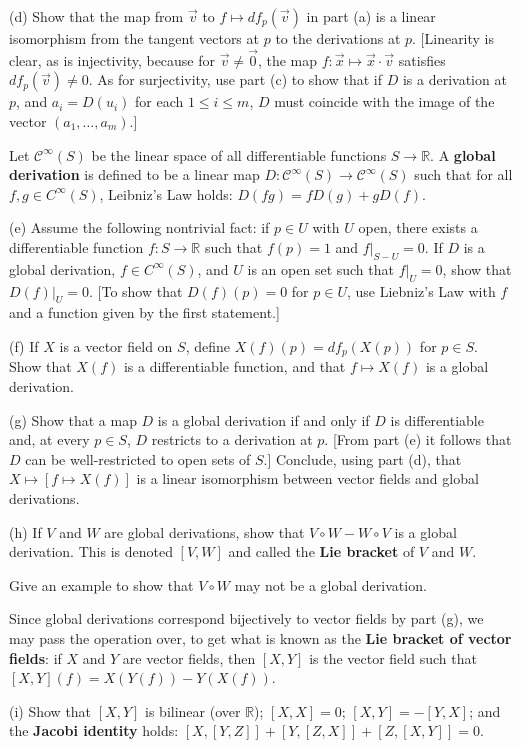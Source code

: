 \documentclass[leqno]{book}
\begin{document}
\begin{enumerate}
(d) Show that the map from $\vec v$ to $f\mapsto df_p(\vec v)$ in part (a) is a linear isomorphism from the tangent vectors at $p$ to the derivations at $p$.  [Linearity is clear, as is injectivity, because for $\vec v\ne\vec 0$, the map $f:\vec x\mapsto\vec x\cdot\vec v$ satisfies $df_p(\vec v)\ne 0$.  As for surjectivity, use part (c) to show that if $D$ is a derivation at $p$, and $a_i=D(u_i)$ for each $1\leqslant i\leqslant m$, $D$ must coincide with the image of the vector $(a_1,\dots,a_m)$.]

Let $\mathcal C^\infty(S)$ be the linear space of all differentiable functions $S\to\mathbb R$.  A \textbf{global derivation} is defined to be a linear map $D:\mathcal C^\infty(S)\to\mathcal C^\infty(S)$ such that for all $f,g\in C^\infty(S)$, Leibniz's Law holds: $D(fg)=fD(g)+gD(f)$.

(e) Assume the following nontrivial fact: if $p\in U$ with $U$ open, there exists a differentiable function $f:S\to\mathbb R$ such that $f(p)=1$ and $f|_{S-U}=0$.  If $D$ is a global derivation, $f\in C^\infty(S)$, and $U$ is an open set such that $f|_U=0$, show that $D(f)|_U=0$.  [To show that $D(f)(p)=0$ for $p\in U$, use Liebniz's Law with $f$ and a function given by the first statement.]

(f) If $X$ is a vector field on $S$, define $X(f)(p)=df_p(X(p))$ for $p\in S$.  Show that $X(f)$ is a differentiable function, and that $f\mapsto X(f)$ is a global derivation.

(g) Show that a map $D$ is a global derivation if and only if $D$ is differentiable and, at every $p\in S$, $D$ restricts to a derivation at $p$.  [From part (e) it follows that $D$ can be well-restricted to open sets of $S$.]  Conclude, using part (d), that $X\mapsto[f\mapsto X(f)]$ is a linear isomorphism between vector fields and global derivations.

(h) If $V$ and $W$ are global derivations, show that $V\circ W-W\circ V$ is a global derivation.  This is denoted $[V,W]$ and called the \textbf{Lie bracket} of $V$ and $W$.

Give an example to show that $V\circ W$ may not be a global derivation.

Since global derivations correspond bijectively to vector fields by part (g), we may pass the operation over, to get what is known as the \textbf{Lie bracket of vector fields}: if $X$ and $Y$ are vector fields, then $[X,Y]$ is the vector field such that $[X,Y](f)=X(Y(f))-Y(X(f))$.

(i) Show that $[X,Y]$ is bilinear (over $\mathbb R$); $[X,X]=0$; $[X,Y]=-[Y,X]$; and the \textbf{Jacobi identity} holds: $[X,[Y,Z]]+[Y,[Z,X]]+[Z,[X,Y]]=0$.


\end{enumerate}
\end{document}
